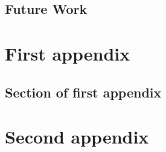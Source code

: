 \documentclass{mproj}
\begin{document}
\section{Future Work}

\appendix %
\chapter{First appendix}

\section{Section of first appendix}

\chapter{Second appendix}



\end{document}
